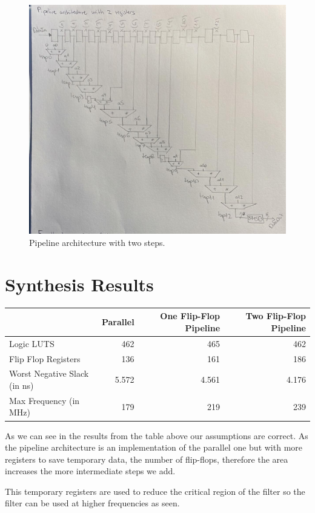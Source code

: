 \documentclass[a4paper, 12pt]{article}
\begin{document}
\begin{figure}[htbp]
\centering
\includegraphics[width=.9\linewidth]{./img/architecture_pipeline.jpg}
\caption{Pipeline architecture with two steps.}
\end{figure}
\section{Synthesis Results}
\label{sec:orgd94f697}

\begin{center}
\begin{tabular}{lrrr}
 & Parallel & One Flip-Flop Pipeline & Two Flip-Flop Pipeline\\
\hline
Logic LUTS & 462 & 465 & 462\\
Flip Flop Registers & 136 & 161 & 186\\
Worst Negative Slack (in ns) & 5.572 & 4.561 & 4.176\\
Max Frequency (in MHz) & 179 & 219 & 239\\
\end{tabular}
\end{center}

As we can see in the results from the table above our assumptions are correct. As the pipeline architecture is an implementation of the parallel one but with more registers to save temporary data, the number of flip-flops, therefore the area increases the more intermediate steps we add.

This temporary registers are used to reduce the critical region of the filter so the filter can be used at higher frequencies as seen.
\end{document}
